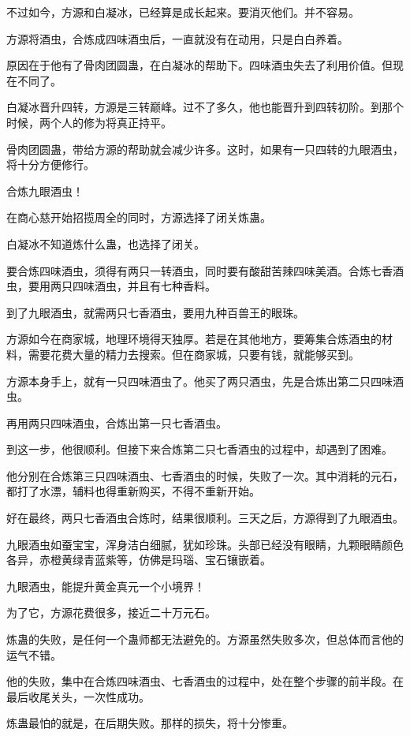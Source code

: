 \begin{this_body}
不过如今，方源和白凝冰，已经算是成长起来。要消灭他们。并不容易。

方源将酒虫，合炼成四味酒虫后，一直就没有在动用，只是白白养着。

原因在于他有了骨肉团圆蛊，在白凝冰的帮助下。四味酒虫失去了利用价值。但现在不同了。

白凝冰晋升四转，方源是三转巅峰。过不了多久，他也能晋升到四转初阶。到那个时候，两个人的修为将真正持平。

骨肉团圆蛊，带给方源的帮助就会减少许多。这时，如果有一只四转的九眼酒虫，将十分方便修行。

合炼九眼酒虫！

在商心慈开始招揽周全的同时，方源选择了闭关炼蛊。

白凝冰不知道炼什么蛊，也选择了闭关。

要合炼四味酒虫，须得有两只一转酒虫，同时要有酸甜苦辣四味美酒。合炼七香酒虫，要用两只四味酒虫，并且有七种香料。

到了九眼酒虫，就需两只七香酒虫，要用九种百兽王的眼珠。

方源如今在商家城，地理环境得天独厚。若是在其他地方，要筹集合炼酒虫的材料，需要花费大量的精力去搜索。但在商家城，只要有钱，就能够买到。

方源本身手上，就有一只四味酒虫了。他买了两只酒虫，先是合炼出第二只四味酒虫。

再用两只四味酒虫，合炼出第一只七香酒虫。

到这一步，他很顺利。但接下来合炼第二只七香酒虫的过程中，却遇到了困难。

他分别在合炼第三只四味酒虫、七香酒虫的时候，失败了一次。其中消耗的元石，都打了水漂，辅料也得重新购买，不得不重新开始。

好在最终，两只七香酒虫合炼时，结果很顺利。三天之后，方源得到了九眼酒虫。

九眼酒虫如蚕宝宝，浑身洁白细腻，犹如珍珠。头部已经没有眼睛，九颗眼睛颜色各异，赤橙黄绿青蓝紫等，仿佛是玛瑙、宝石镶嵌着。

九眼酒虫，能提升黄金真元一个小境界！

为了它，方源花费很多，接近二十万元石。

炼蛊的失败，是任何一个蛊师都无法避免的。方源虽然失败多次，但总体而言他的运气不错。

他的失败，集中在合炼四味酒虫、七香酒虫的过程中，处在整个步骤的前半段。在最后收尾关头，一次性成功。

炼蛊最怕的就是，在后期失败。那样的损失，将十分惨重。


\end{this_body}
